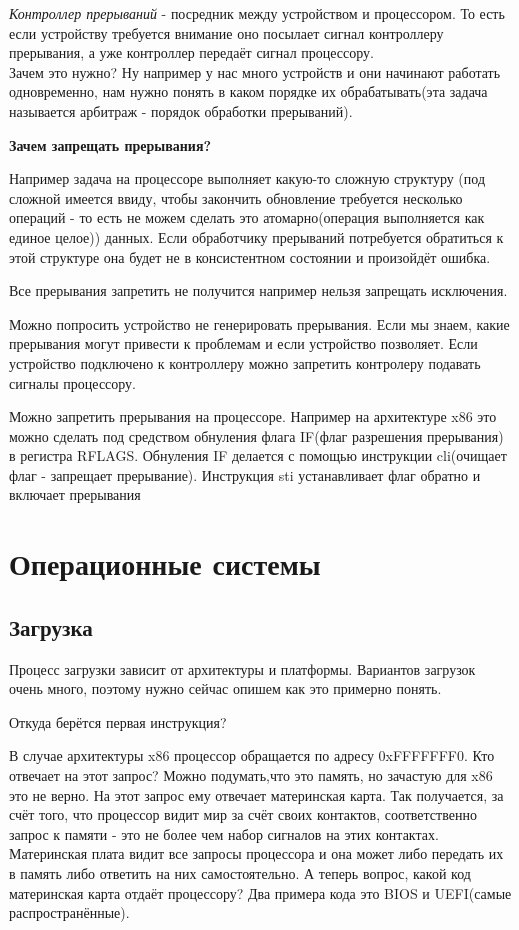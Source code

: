     \par \textit{Контроллер прерываний} - посредник между устройством и процессором. То есть если устройству требуется внимание оно посылает сигнал контроллеру прерывания, а уже контроллер передаёт сигнал процессору. 
    \\ Зачем это нужно? Ну например у нас много устройств и они начинают работать одновременно, нам нужно понять в каком порядке их обрабатывать(эта задача называется арбитраж - порядок обработки прерываний).
    
    \par \textbf{Зачем запрещать прерывания?} 
    \par Например задача на процессоре выполняет какую-то сложную структуру (под сложной имеется ввиду, чтобы закончить обновление требуется несколько операций - то есть не можем сделать это атомарно(операция выполняется как единое целое)) данных. Если обработчику прерываний потребуется обратиться к этой структуре она будет не в консистентном состоянии и произойдёт ошибка.
    \par Все прерывания запретить не получится например нельзя запрещать исключения. 
    \par Можно попросить устройство не генерировать прерывания. Если мы знаем, какие прерывания могут привести к проблемам и если устройство позволяет.  Если устройство подключено к контроллеру можно запретить контролеру подавать сигналы процессору.
    \par Можно запретить прерывания на процессоре. Например на архитектуре x86 это можно сделать под средством обнуления флага IF(флаг разрешения прерывания) в регистра RFLAGS. Обнуления IF делается с помощью инструкции cli(очищает флаг - запрещает прерывание). Инструкция sti устанавливает флаг обратно и включает прерывания
    
	\section{Операционные системы}
	
	\par
	
	\subsection{Загрузка}
	\par Процесс загрузки зависит от архитектуры и платформы. Вариантов загрузок очень много, поэтому нужно сейчас опишем как это примерно понять.
	\par Откуда берётся первая инструкция? 
	\par В случае архитектуры x86 процессор обращается по адресу 0xFFFFFFF0. Кто отвечает на этот запрос? Можно подумать,что это память, но зачастую для x86 это не верно. На этот запрос ему отвечает материнская карта. Так получается, за счёт того, что процессор видит мир за счёт своих контактов, соответственно запрос к памяти - это не более чем набор сигналов на этих контактах. Материнская плата видит все запросы процессора и она может либо передать их в память либо ответить на них самостоятельно. А теперь вопрос, какой код материнская карта отдаёт процессору? Два примера кода это BIOS и UEFI(самые распространённые). 

